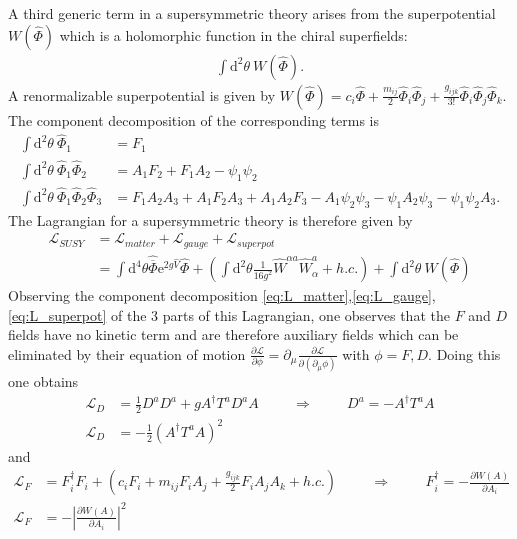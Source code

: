 A third generic term in a supersymmetric theory arises from the superpotential $W(\hat{\Phi})$ which is a holomorphic function in the chiral superfields:
\begin{align}
\int\mathrm{d}^2\theta\ W(\hat{\Phi}).
\end{align}
A renormalizable superpotential is given by $W(\hat{\Phi}) = c_i\hat{\Phi} + \frac{m_{ij}}{2}\hat{\Phi}_i\hat{\Phi}_j + \frac{g_{ijk}}{3!}\hat{\Phi}_i\hat{\Phi}_j\hat{\Phi}_k$. The component decomposition of the corresponding terms is
\begin{align}
\int\mathrm{d}^2\theta\ \hat{\Phi}_1 &= F_1\nonumber\\
\int\mathrm{d}^2\theta\ \hat{\Phi}_1\hat{\Phi}_2 &= A_1F_2 + F_1A_2-\psi_1\psi_2\nonumber\\
\int\mathrm{d}^2\theta\ \hat{\Phi}_1\hat{\Phi}_2\hat{\Phi}_3 &= F_1A_2A_3 + A_1F_2A_3 + A_1A_2F_3 - A_1\psi_2\psi_3 - \psi_1A_2\psi_3 - \psi_1\psi_2A_3.\label{eq:L_superpot}
\end{align}
The Lagrangian for a supersymmetric theory is therefore given by 
\begin{align}
\mathcal{L}_{SUSY} &= \mathcal{L}_{matter} + \mathcal{L}_{gauge} + \mathcal{L}_{superpot}\nonumber\\
&=\int\mathrm{d}^4\theta\hat{\overline{\Phi}}\mathrm{e}^{2g\hat{V}}\hat{\Phi} + \left(\int\mathrm{d}^2\theta \frac{1}{16g^2 }\hat{W}^{\alpha a} \hat{W}^a_\alpha + h.c. \right) +\int\mathrm{d}^2\theta\ W(\hat{\Phi})
\end{align}
Observing the component decomposition \ref{eq:L_matter},\ref{eq:L_gauge}, \ref{eq:L_superpot} of the 3 parts of this Lagrangian, one observes that the $F$ and $D$ fields have no kinetic term and are therefore auxiliary fields which can be eliminated by their equation of motion $\frac{\partial \mathcal{L}}{\partial\phi} = \partial_\mu\frac{\partial \mathcal{L}}{\partial(\partial_\mu \phi)}$ with $\phi = F, D$. Doing this one obtains
\begin{align}
\mathcal{L}_D &= \frac{1}{2} D^aD^a + g A^\dagger T^aD^a A \hspace{1cm} \Rightarrow \hspace{1cm} D^a = - A^\dagger T^a A \nonumber\\
\mathcal{L}_D &= -\frac{1}{2}\left( A^\dagger T^a A \right)^2
\end{align}
and 
\begin{align}
\mathcal{L}_F &= F_i^\dagger F_i + \left( c_iF_i + m_{ij}F_iA_j + \frac{g_{ijk}}{2}F_iA_jA_k + h.c. \right) \hspace{1cm} \Rightarrow \hspace{1cm} F^\dagger_i = - \frac{\partial W(A)}{\partial A_i}\nonumber\\
\mathcal{L}_F &= -\left| \frac{\partial W(A)}{\partial A_i} \right|^2
\end{align}



